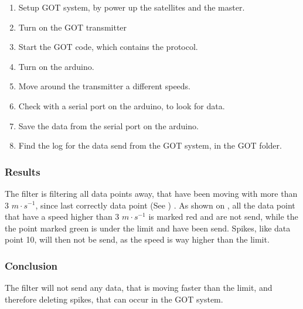 \begin{enumerate}
  \item Setup GOT system, by power up the satellites and the master.
  \item Turn on the GOT transmitter
  \item Start the GOT code, which contains the protocol.
  \item Turn on the arduino.
  \item Move around the transmitter a different speeds.
  \item Check with a serial port on the arduino, to look for data.
  \item Save the data from the serial port on the arduino.
  \item Find the log for the data send from the GOT system, in the GOT folder.
\end{enumerate}

\subsubsection{Results}

The filter is filtering all data points away, that have been moving with more than 3 $m \cdot s^{-1}$, since last correctly data point (See \secref{}) . As shown on \figref{}, all the data point that have a speed higher than 3 $m \cdot s^{-1}$ is marked red and are not send, while the the point marked green is under the limit and have been send. Spikes, like data point 10, will then not be send, as the speed is way higher than the limit.

\subsubsection{Conclusion}
The filter will not send any data, that is moving faster than the limit, and therefore deleting spikes, that can occur in the GOT system.

